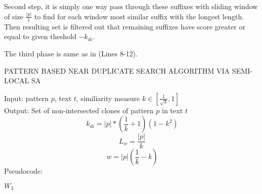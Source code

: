 Second step, it is simply one way pass through these suffixes with sliding window  of size $\frac{|p|}{t}$ to find for each window most similar suffix with the longest length. Then resulting set is filtered out that remaining suffixes have score greater or equal to given theshold $-k_{di}$. 

The third phase is same as in \cite{luciv2019interactive} (Lines 8-12).  






\begin{algorithm}[H]
\caption{PATTERN BASED NEAR DUPLICATE
SEARCH ALGORITHM VIA SEMI-LOCAL SA}
\label{alg:patternMathing1}
Input: pattern $p$, text $t$, similiarity measure $k \in  [ \frac{1}{\sqrt{3}} ,1  ]$\\
Output: Set of non-intersected clones of pattern $p$ in text $t$
\begin{equation}
    k_{di}=|p|*(\frac{1}{k}+1)(1-k^2)
\end{equation}
\begin{equation}
 L_{w} = \frac{|p|} {k}
\end{equation}
\begin{equation}
  w = |p|(\frac{1}{k} - k)
\end{equation}
Pseudocode:
\begin{algorithmic}[1]
\ENDIF
\ENDFOR
\RETURN $W_3$

\end{algorithmic}
\end{algorithm}


